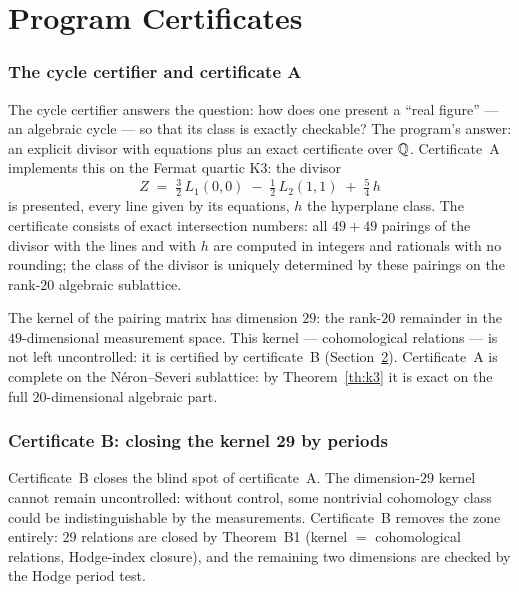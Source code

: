 \part{Program Certificates}

\section{The cycle certifier and certificate A}\label{sec:certA}

The cycle certifier answers the question: how does one present a
``real figure'' --- an algebraic cycle --- so that its class is
exactly checkable? The program's answer: an explicit divisor with
equations plus an exact certificate over $\mathbb{Q}$. Certificate~A
implements this on the Fermat quartic K3: the divisor
\[
  Z \;=\; \tfrac32\,L_1(0,0)\;-\;\tfrac12\,L_2(1,1)\;+\;\tfrac54\,h
\]
is presented, every line given by its equations, $h$ the hyperplane
class. The certificate consists of exact intersection numbers: all
$49+49$ pairings of the divisor with the lines and with $h$ are
computed in integers and rationals with no rounding; the class of
the divisor is uniquely determined by these pairings on the
rank-$20$ algebraic sublattice.

The kernel of the pairing matrix has dimension $29$: the rank-$20$
remainder in the $49$-dimensional measurement space. This kernel ---
cohomological relations --- is not left uncontrolled: it is
certified by certificate~B (Section~\ref{sec:certB}). Certificate~A
is complete on the N\'eron--Severi sublattice: by Theorem~\ref{th:k3}
it is exact on the full $20$-dimensional algebraic part.

\section{Certificate B: closing the kernel 29 by periods}
\label{sec:certB}

Certificate~B closes the blind spot of certificate~A. The
dimension-$29$ kernel cannot remain uncontrolled: without control,
some nontrivial cohomology class could be indistinguishable by the
measurements. Certificate~B removes the zone entirely: $29$
relations are closed by Theorem~B1 (kernel $=$ cohomological
relations, Hodge-index closure), and the remaining two dimensions
are checked by the Hodge period test.

